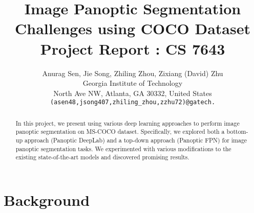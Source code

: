 \documentclass[10pt,twocolumn,letterpaper]{article}
\begin{document}
\title{Image Panoptic Segmentation Challenges using COCO Dataset \\ Project Report : CS 7643}

\author{Anurag Sen, Jie Song, Zhiling Zhou, Zixiang (David) Zhu\\
Georgia Institute of Technology\\
North Ave NW, Atlanta, GA 30332, United States\\
{\tt\small (asen48,jsong407,zhiling\_zhou,zzhu72)@gatech.}
}

\maketitle

\begin{abstract}
   In this project, we present using various deep learning approaches to perform image panoptic segmentation on MS-COCO dataset. Specifically, we explored both a bottom-up approach (Panoptic DeepLab) and a top-down approach (Panoptic FPN) for image panoptic segmentation tasks. We experimented with various modifications to the existing state-of-the-art models and discovered promising results. 
\end{abstract}

\section{Background}

\end{document}
